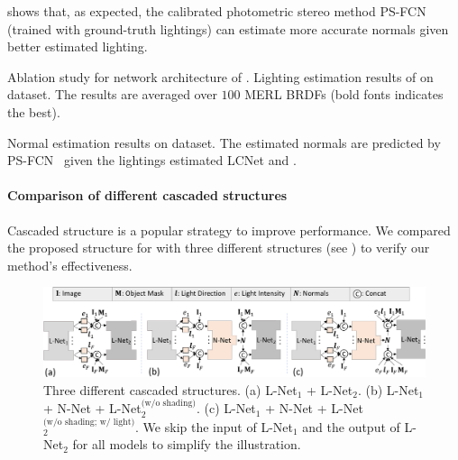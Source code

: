 shows that, as expected, the calibrated photometric stereo method PS-FCN (trained with ground-truth lightings) can estimate more accurate normals given better estimated lighting.

\begin{table}[tbp]
    \caption[Ablation study for network architecture of \gcnetacronym]{Ablation study for network architecture of \gcnetacronym. Lighting estimation results of \gcnetacronym on \syntestMERL dataset. The results are averaged over $100$ MERL BRDFs (bold fonts indicates the best).}
     \label{tab:synth_test_light}
\end{table}

\begin{table}[tbp] \centering
    \caption[Normal estimation results on \syntestMERL dataset]{Normal estimation results on \syntestMERL dataset. The estimated normals are predicted by PS-FCN~\cite{chen2018ps} given the lightings estimated LCNet and \gcnetacronym.}
    
    \label{tab:synth_test_normal}
\end{table}

\paragraph{Comparison of different cascaded structures}
Cascaded structure is a popular strategy to improve performance. We compared the proposed structure for \gcnetacronym with three different structures (see ) to verify our method's effectiveness.

\begin{figure}[tbp] \centering%
	\includegraphics[width=\textwidth]{ch-gcnet/images/Method/different_structures_simple.pdf}
    \caption[Three different cascaded structures]{Three different cascaded structures. (a) L-Net$_1$ + L-Net$_2$. (b) L-Net$_1$ + N-Net + L-Net$_2^\text{(w/o shading)}$. (c) L-Net$_1$ + N-Net + L-Net$_2^\text{(w/o shading; w/ light)}$. We skip the input of L-Net$_1$ and the output of L-Net$_2$ for all models to simplify the illustration.} \label{fig:cascaded}
\end{figure}


